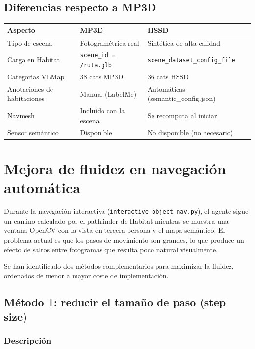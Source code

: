 \documentclass[11pt,a4paper]{article}
\begin{document}
\subsection{Diferencias respecto a MP3D}

\begin{center}
\begin{tabular}{lll}
\toprule
\textbf{Aspecto} & \textbf{MP3D} & \textbf{HSSD} \\
\midrule
Tipo de escena & Fotogramétrica real & Sintética de alta calidad \\
Carga en Habitat & \texttt{scene\_id = /ruta.glb} & \texttt{scene\_dataset\_config\_file} \\
Categorías VLMap & 38 cats MP3D & 36 cats HSSD \\
Anotaciones de habitaciones & Manual (LabelMe) & Automáticas (semantic\_config.json) \\
Navmesh & Incluido con la escena & Se recomputa al iniciar \\
Sensor semántico & Disponible & No disponible (no necesario) \\
\bottomrule
\end{tabular}
\end{center}


\section{Mejora de fluidez en navegación automática}

Durante la navegación interactiva (\texttt{interactive\_object\_nav.py}), el agente sigue un camino calculado por el pathfinder de Habitat mientras se muestra una ventana OpenCV con la vista en tercera persona y el mapa semántico. El problema actual es que los pasos de movimiento son grandes, lo que produce un efecto de saltos entre fotogramas que resulta poco natural visualmente.

Se han identificado dos métodos complementarios para maximizar la fluidez, ordenados de menor a mayor coste de implementación.

\subsection{Método 1: reducir el tamaño de paso (step size)}

\subsubsection*{Descripción}
\end{document}
